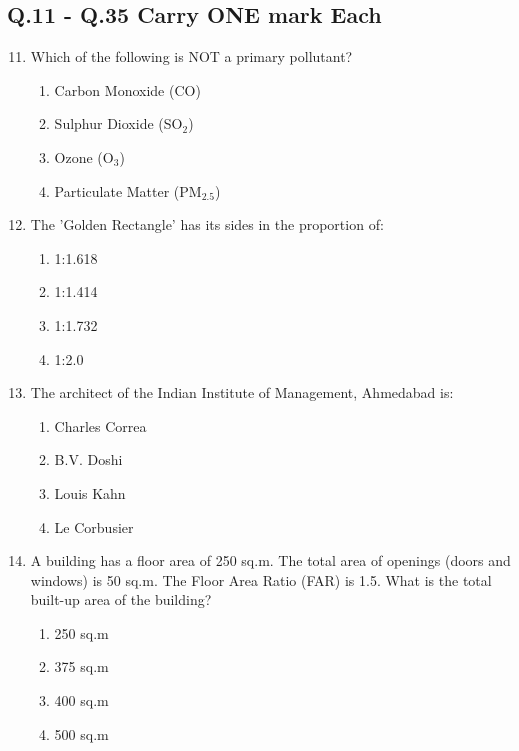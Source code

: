 \documentclass[a4paper,10pt]{article}
\begin{document}
\subsection*{Q.11 - Q.35 Carry ONE mark Each}
\begin{enumerate}
    \setcounter{enumi}{10}
    \item Which of the following is NOT a primary pollutant?
    \begin{multicols}{4}
    \begin{enumerate}
        \item Carbon Monoxide (CO)
        \item Sulphur Dioxide (SO$_2$)
        \item Ozone (O$_3$)
        \item Particulate Matter (PM$_{2.5}$)
    \end{enumerate}
    \end{multicols}
    
    \item The 'Golden Rectangle' has its sides in the proportion of:
    \begin{multicols}{4}
    \begin{enumerate}
        \item 1:1.618
        \item 1:1.414
        \item 1:1.732
        \item 1:2.0
    \end{enumerate}
    \end{multicols}
    
    \item The architect of the Indian Institute of Management, Ahmedabad is:
    \begin{multicols}{4}
    \begin{enumerate}
        \item Charles Correa
        \item B.V. Doshi
        \item Louis Kahn
        \item Le Corbusier
    \end{enumerate}
    \end{multicols}
    
    \item A building has a floor area of 250 sq.m. The total area of openings (doors and windows) is 50 sq.m. The Floor Area Ratio (FAR) is 1.5. What is the total built-up area of the building?
    \begin{multicols}{4}
    \begin{enumerate}
        \item 250 sq.m
        \item 375 sq.m
        \item 400 sq.m
        \item 500 sq.m
    \end{enumerate}
    \end{multicols}


\end{enumerate}
\end{document}

